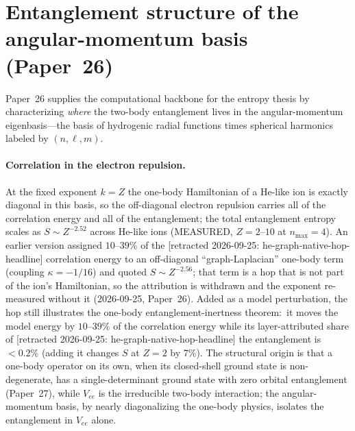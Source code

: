 \documentclass[aps,pra,twocolumn,superscriptaddress,longbibliography,nofootinbib]{revtex4-2}
\begin{document}
\section{Entanglement structure of the angular-momentum basis (Paper~26)}

Paper~26 supplies the computational backbone for the entropy thesis by
characterizing \emph{where} the two-body entanglement lives in the
angular-momentum eigenbasis---the basis of hydrogenic radial functions
times spherical harmonics labeled by $(n,\ell,m)$.

\paragraph{Correlation in the electron repulsion.}
At the fixed exponent $k=Z$ the one-body Hamiltonian of a He-like ion
is exactly diagonal in this basis, so the off-diagonal electron
repulsion carries all of the correlation energy and all of the
entanglement; the total entanglement entropy scales as
$S\sim Z^{-2.52}$ across He-like ions (MEASURED, $Z=2$--$10$ at
$n_{\max}=4$).  An earlier version assigned $10$--$39\%$ of the [retracted 2026-09-25: he-graph-native-hop-headline]
correlation energy to an off-diagonal ``graph-Laplacian'' one-body term
(coupling $\kappa=-1/16$) and quoted $S\sim Z^{-2.56}$; that term is a
hop that is not part of the ion's Hamiltonian, so the attribution is
withdrawn and the exponent re-measured without it (2026-09-25,
Paper~26).  Added as a model perturbation, the hop still illustrates
the one-body entanglement-inertness theorem:\ it moves the model energy
by $10$--$39\%$ of the correlation energy while its layer-attributed share of [retracted 2026-09-25: he-graph-native-hop-headline]
the entanglement is $<0.2\%$ (adding it changes $S$ at $Z=2$ by $7\%$).
The structural origin is that a one-body operator on its own, when its
closed-shell ground state is non-degenerate, has a single-determinant
ground state with zero orbital
entanglement (Paper~27), while $V_{ee}$ is the irreducible two-body interaction;
the angular-momentum basis, by nearly diagonalizing the one-body physics,
isolates the entanglement in $V_{ee}$ alone.
\end{document}
